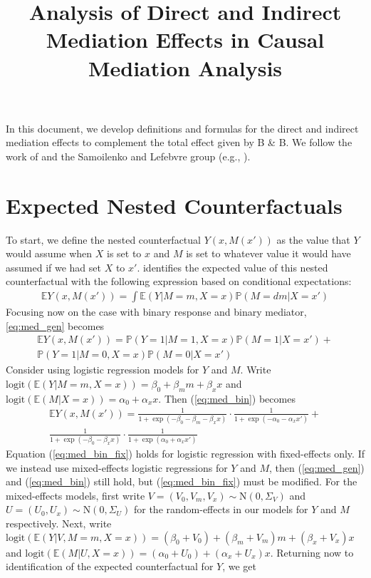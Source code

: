 \documentclass{article}
\title{Analysis of Direct and Indirect Mediation Effects in Causal Mediation Analysis}
\newcommand{\bP}{\mathbb{P}}
\newcommand{\bE}{\mathbb{E}}
\begin{document}
\maketitle

In this document, we develop definitions and formulas for the direct and indirect mediation effects to complement the total effect given by B \& B. We follow the work of \citet{Pea12} and the Samoilenko and Lefebvre group (e.g., \citealp{Sam23}). 

\section{Expected Nested Counterfactuals}
\label{sec:nest_CFs}

To start, we define the nested counterfactual $Y(x, M(x'))$ as the value that $Y$ would assume when $X$ is set to $x$ and $M$ is set to whatever value it would have assumed if we had set $X$ to $x'$. \citet{Pea12} identifies the expected value of this nested counterfactual with the following expression based on conditional expectations:
%
\begin{align}
    \bE Y(x, M(x')) = \int \bE(Y | M=m, X=x) \bP(M = dm | X = x') \label{eq:med_gen}
\end{align}
%
Focusing now on the case with binary response and binary mediator, \ref{eq:med_gen} becomes
%
\begin{multline}
    \bE Y(x, M(x')) = \bP(Y=1 | M=1, X=x) \bP(M=1 | X=x') + \\\bP(Y=1 | M=0, X=x) \bP(M=0 | X=x') \label{eq:med_bin}
\end{multline}
%
Consider using  logistic regression models for $Y$ and $M$. Write $\mathrm{logit}(\bE(Y | M=m, X=x)) = \beta_0 + \beta_m m + \beta_x x$ and $\mathrm{logit}(\bE(M | X=x)) = \alpha_0 + \alpha_x x$. Then (\ref{eq:med_bin}) becomes
%
\begin{multline}
    \bE Y(x, M(x')) = \frac{1}{1 + \exp(-\beta_0 - \beta_m - \beta_x x)} \cdot \frac{1}{1 + \exp(-\alpha_0 - \alpha_x x')} +\\
    \frac{1}{1 + \exp(-\beta_0 - \beta_x x)} \cdot \frac{1}{1 + \exp(\alpha_0 + \alpha_x x')} \label{eq:med_bin_fix}
\end{multline}
%
Equation (\ref{eq:med_bin_fix}) holds for logistic regression with fixed-effects only. If we instead use  mixed-effects logistic regressions for $Y$ and $M$, then (\ref{eq:med_gen}) and (\ref{eq:med_bin}) still hold, but (\ref{eq:med_bin_fix}) must be modified. For the mixed-effects models, first write $V = (V_0, V_m, V_x) \sim \mathrm{N}(0, \Sigma_V)$ and $U = (U_0, U_x) \sim \mathrm{N}(0, \Sigma_U)$ for the random-effects in our models for $Y$ and $M$ respectively. Next, write $\mathrm{logit}(\bE(Y | V, M=m, X=x)) = (\beta_0 + V_0) + (\beta_m + V_m) m + (\beta_x + V_x) x$ and $\mathrm{logit}(\bE(M |U, X=x)) = (\alpha_0 + U_0) + (\alpha_x + U_x) x$. Returning now to identification of the expected counterfactual for $Y$, we get
\end{document}
